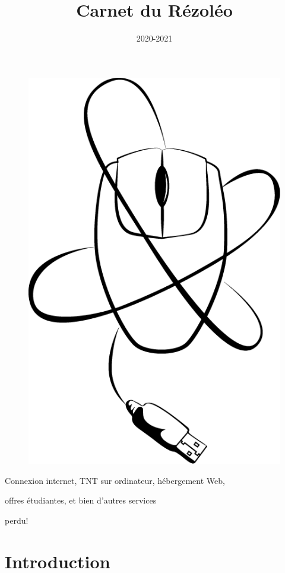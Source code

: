 \documentclass[12pt]{article}
\begin{document}
\title{Carnet du Rézoléo}
\author{}
\date{2020-2021}
\maketitle
\vspace*{1cm}
\begin{figure}[h!]
\centerline{\includegraphics[scale=0.35]{rezoleo.png}}
\end{figure}
\vspace*{1cm}

\centerline{Connexion internet, TNT sur ordinateur, hébergement Web,}
\centerline{offres étudiantes, et bien d'autres services}

\newpage
\color{white}
perdu!
\newpage
\color{black}
\section{Introduction}
\end{document}
